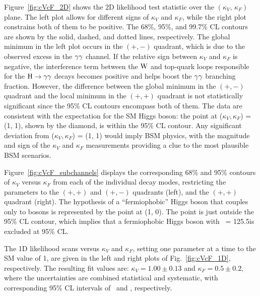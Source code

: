 \documentclass[11pt,twoside,a4paper,cmspaper,final,collab]{cms-tdr}
\begin{document}
Figure~\ref{fig:cVcF_2D} shows the 2D likelihood test statistic
over the $(\kappa_V,\,\kappa_F)$ plane.
The left plot allows for different signs of $\kappa_V$ and $\kappa_F$, while the
right plot constrains both of them to be positive.
The 68\%,  95\%, and 99.7\% CL contours
are shown by the solid, dashed, and dotted lines, respectively.
The global minimum in the left plot
occurs in the $(+,-)$ quadrant, which is due to the observed excess in the $\gamma\gamma$ channel.
If the relative sign between
$\kappa_V$ and $\kappa_F$ is negative, the interference term between
the $\mathrm{W}$ and top-quark loops responsible for the $\mathrm{H} \to \gamma\gamma$ decays becomes positive
and helps boost the $\gamma\gamma$ branching fraction.
However, the difference between the global minimum in the $(+,-)$ quadrant and
the local minimum in the $(+,+)$ quadrant is not statistically significant
since the 95\% CL contours encompass both of them.
The data are consistent with the expectation for the
SM Higgs boson: the point at ($\kappa_V,\kappa_F$) = (1, 1), shown by the diamond, is within the 95\% CL contour.
Any significant deviation from ($\kappa_V,\kappa_F$) = (1, 1) would imply BSM physics, with
the magnitude and sign of the $\kappa_V$ and $\kappa_F$ measurements
providing a clue to the most plausible BSM scenarios.

Figure~\ref{fig:cVcF_subchannels} displays the corresponding 68\% and 95\% contours of $\kappa_V$ versus $\kappa_F$
from each of the individual decay modes,
restricting the parameters to the $(+,+)$ and $(+,-)$ quadrants (left), and the $(+,+)$ quadrant (right).
The hypothesis of a ``fermiophobic'' Higgs boson that couples only to bosons
is represented by the point at (1, 0). The point is just outside the 95\% CL contour,
which implies that  a fermiophobic Higgs boson with \mH\ = 125.5\GeV is excluded at 95\% CL.

The 1D likelihood scans versus $\kappa_V$ and $\kappa_F$,
setting one parameter at a time to the SM value of 1,
are given in the left and right plots of Fig.~\ref{fig:cVcF_1D}, respectively.
The resulting fit values are:
$\kappa_V =1.00 \pm 0.13$ and
$\kappa_F= 0.5 \pm 0.2$,
where the uncertainties are combined statistical and
systematic, with corresponding
95\% CL intervals of \CVNF\ and \CFNF, respectively.
\end{document}
